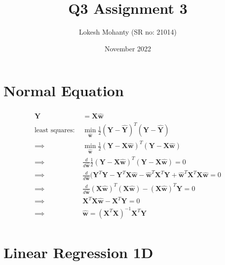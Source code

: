 \documentclass[12pt, letterpaper]{article}
\title{Q3 Assignment 3}
\author{Lokesh Mohanty (SR no: 21014)}
\date{November 2022}
\begin{document}
\maketitle

\section*{Normal Equation}

\begin{align*}
  \mathbf{\hat{Y}} &= \mathbf{X}\mathbf{\hat{w}} \\
  \text{least squares: } &\min_{\mathbf{\hat{w}}} \frac{1}{2}(\mathbf{Y} - \mathbf{\hat{Y}})^T(\mathbf{Y} - \mathbf{\hat{Y}}) \\
  \implies &\min_{\mathbf{\hat{w}}} \frac{1}{2}(\mathbf{Y} - \mathbf{X}\mathbf{\hat{w}})^T(\mathbf{Y} - \mathbf{X}\mathbf{\hat{w}}) \\
  \implies &\frac{d}{d\mathbf{\hat{w}}}\frac{1}{2}(\mathbf{Y} - \mathbf{X}\mathbf{\hat{w}})^T(\mathbf{Y} - \mathbf{X}\mathbf{\hat{w}}) = 0\\
  \implies &\frac{d}{d\mathbf{\hat{w}}}(\mathbf{Y}^T\mathbf{Y} - \mathbf{Y}^T\mathbf{X}\mathbf{\hat{w}} - \mathbf{\hat{w}}^T\mathbf{X}^T\mathbf{Y} + \mathbf{\hat{w}}^T\mathbf{X}^T\mathbf{X}\mathbf{\hat{w}} = 0\\
  \implies &\frac{d}{d\mathbf{\hat{w}}} (\mathbf{X}\mathbf{\hat{w}})^T(\mathbf{X}\mathbf{\hat{w}}) - (\mathbf{X}\mathbf{\hat{w}})^T\mathbf{Y} = 0 \\
  \implies &\mathbf{X}^T\mathbf{X}\mathbf{\hat{w}} - \mathbf{X}^T\mathbf{Y} = 0 \\
  \implies &\mathbf{\hat{w}} = (\mathbf{X}^T\mathbf{X})^{-1}\mathbf{X}^T\mathbf{Y} \\
\end{align*}

\section*{Linear Regression 1D}
\end{document}

